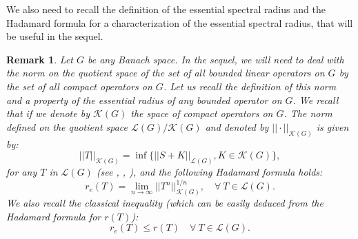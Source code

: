 \documentclass[10pt, english]{article}
\newtheorem{oss}[thm]{Remark}
\begin{document}
{We also need to recall the definition of the essential spectral radius and the Hadamard formula for a characterization of the essential spectral radius, that will be useful in the sequel.
\begin{oss}\label{G}
Let $G$ be any Banach space. In the sequel, we will need to deal with the norm on the quotient space of the set of all bounded linear operators on $G$ by the set of all compact operators on $G$. Let us recall the definition of this norm and a property of the essential radius of any bounded operator on $G$.
We recall that if we denote by $\mathcal{K}(G)$ the space of compact operators on $G$. The norm  defined on the quotient space $\mathcal{L}(G)/ \mathcal{K}(G)$  and denoted by $|| \cdot||_{\mathcal{K}(G)}$ 
is given by:
\begin{equation}\label{C4.23}%
|| T ||_{\mathcal{K}(G)}=\inf\{ ||S+K||_{\mathcal{L}(G)}, K \in \mathcal{K}(G)\},
\end{equation}
for any $T$ in $\mathcal{L}(G)$ (see \cite{Y1965}, \cite{N1970}, \cite{K1980}),
and the following Hadamard formula holds:
\begin{equation}\label{C4.24}%
r_e(T)=\lim_{n \rightarrow \infty}||T^n||_{\mathcal{K}(G)}^{1/n}, \quad \forall \ T \in \mathcal{L}(G).
\end{equation}
We also recall the classical inequality (which can be easily deduced from the Hadamard formula for $r(T)$):
\begin{equation}\label{relr}
r_e(T) \leqslant r(T) \quad \forall \ T \in \mathcal{L}(G).
\end{equation}
\end{oss}

}
\end{document}
